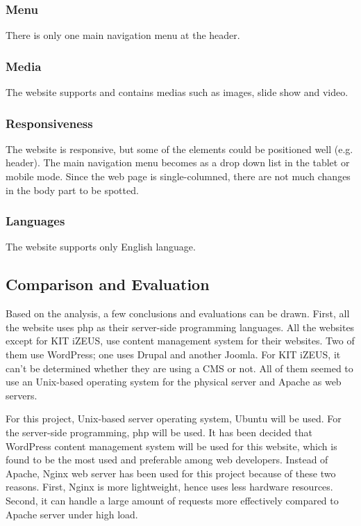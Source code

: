 \subsubsection*{Menu}
There is only one main navigation menu at the header.

\subsubsection*{Media}
The website supports and contains medias such as images, slide show and video.

\subsubsection*{Responsiveness}
The website is responsive, but some of the elements could be positioned well (e.g. header). The main navigation menu becomes as a drop down list in the tablet or mobile mode. Since the web page is single-columned, there are not much changes in the body part to be spotted.

\subsubsection*{Languages}
The website supports only English language.

\subsection{Comparison and Evaluation}
Based on the analysis, a few conclusions and evaluations can be drawn. First, all the website uses \ac{php} as their server-side programming languages. All the websites except for KIT iZEUS, use content management system for their websites. Two of them use WordPress; one uses Drupal and another Joomla. For KIT iZEUS, it can't be determined whether they are using a CMS or not. All of them seemed to use an Unix-based operating system for the physical server and Apache as web servers.

For this project, Unix-based server operating system, Ubuntu will be used. For the server-side programming, \ac{php} will be used. It has been decided that WordPress content management system will be used for this website, which is found to be the most used and preferable among web developers. Instead of Apache, Nginx web server has been used for this project because of these two reasons. First, Nginx is more lightweight, hence uses less hardware resources. Second, it can handle a large amount of requests more effectively compared to Apache server under high load.

